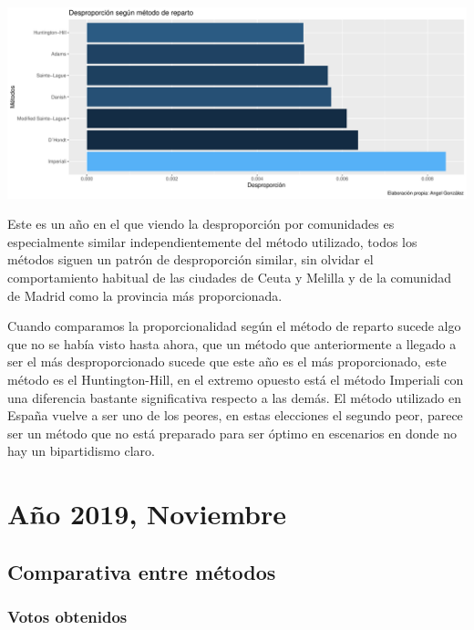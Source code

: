 \documentclass[12pt,a4paper,]{book}
\numberwithin{dummy}{section}
\theoremstyle{ocrenumbox}
\theoremstyle{blacknumex}
\theoremstyle{blacknumbox}
\theoremstyle{ocrenum}
\theoremstyle{ocrenum}
\begin{document}
\begin{center}\includegraphics[width=0.95\linewidth]{figurasR/unnamed-chunk-177-2} \end{center}

Este es un año en el que viendo la desproporción por comunidades es
especialmente similar independientemente del método utilizado, todos los
métodos siguen un patrón de desproporción similar, sin olvidar el
comportamiento habitual de las ciudades de Ceuta y Melilla y de la
comunidad de Madrid como la provincia más proporcionada.

Cuando comparamos la proporcionalidad según el método de reparto sucede
algo que no se había visto hasta ahora, que un método que anteriormente
a llegado a ser el más desproporcionado sucede que este año es el más
proporcionado, este método es el Huntington-Hill, en el extremo opuesto
está el método Imperiali con una diferencia bastante significativa
respecto a las demás. El método utilizado en España vuelve a ser uno de
los peores, en estas elecciones el segundo peor, parece ser un método
que no está preparado para ser óptimo en escenarios en donde no hay un
bipartidismo claro.

\hypertarget{auxf1o-2019-noviembre}{%
\section{Año 2019, Noviembre}\label{auxf1o-2019-noviembre}}

\hypertarget{comparativa-entre-muxe9todos-14}{%
\subsection{Comparativa entre
métodos}\label{comparativa-entre-muxe9todos-14}}

\hypertarget{votos-obtenidos-14}{%
\subsubsection{Votos obtenidos}\label{votos-obtenidos-14}}
\end{document}
